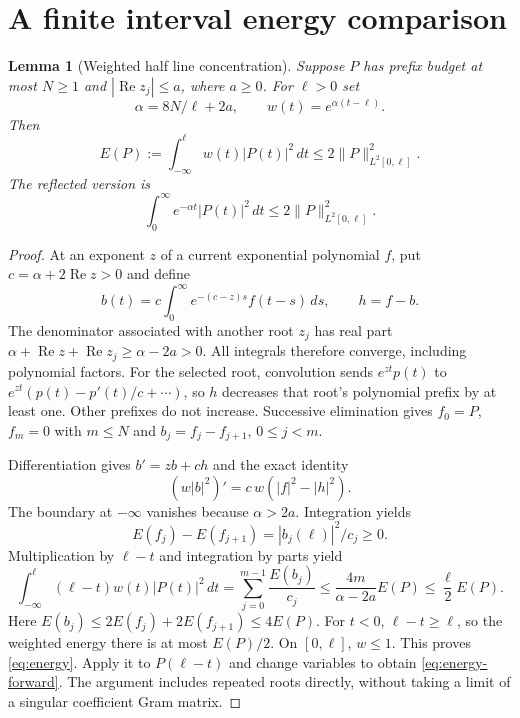 \documentclass[11pt]{article}
\newtheorem{lemma}[theorem]{Lemma}
\theoremstyle{remark}
\newcommand{\norm}[1]{\lVert #1\rVert}
\newcommand{\Rea}{\operatorname{Re}}
\begin{document}
\section{A finite interval energy comparison}
\begin{lemma}[Weighted half line concentration]\label{lem:energy}
Suppose $P$ has prefix budget at most $N\ge1$ and $|\Rea z_j|\le a$,
where $a\ge0$. For $\ell>0$ set
\[
 \alpha=8N/\ell+2a,\qquad w(t)=e^{\alpha(t-\ell)}.
\]
Then
\begin{equation}\label{eq:energy}
 E(P):=\int_{-\infty}^{\ell}w(t)|P(t)|^2\,dt
       \le2\norm P_{L^2[0,\ell]}^2.
\end{equation}
The reflected version is
\begin{equation}\label{eq:energy-forward}
 \int_0^\infty e^{-\alpha t}|P(t)|^2\,dt
       \le2\norm P_{L^2[0,\ell]}^2.
\end{equation}
\end{lemma}
\begin{proof}
At an exponent $z$ of a current exponential polynomial $f$, put
$c=\alpha+2\Rea z>0$ and define
\[
 b(t)=c\int_0^\infty e^{-(c-z)s}f(t-s)\,ds,\qquad h=f-b.
\]
The denominator associated with another root $z_j$ has real part
$\alpha+\Rea z+\Rea z_j\ge\alpha-2a>0$.
All integrals therefore converge, including polynomial factors.
For the selected root, convolution sends $e^{zt}p(t)$ to
$e^{zt}(p(t)-p'(t)/c+\cdots)$, so $h$ decreases that root's polynomial
prefix by at least one. Other prefixes do not increase.
Successive elimination gives $f_0=P$, $f_m=0$ with $m\le N$ and
$b_j=f_j-f_{j+1}$, $0\le j<m$.

Differentiation gives $b'=zb+ch$ and the exact identity
\begin{equation}\label{eq:energy-identity}
 (w|b|^2)'=c\,w(|f|^2-|h|^2).
\end{equation}
The boundary at $-\infty$ vanishes because $\alpha>2a$.
Integration yields
\[
 E(f_j)-E(f_{j+1})=|b_j(\ell)|^2/c_j\ge0.
\]
Multiplication by $\ell-t$ and integration by parts yield
\[
 \int_{-\infty}^{\ell}(\ell-t)w(t)|P(t)|^2\,dt
   =\sum_{j=0}^{m-1}\frac{E(b_j)}{c_j}
   \le\frac{4m}{\alpha-2a}E(P)\le\frac\ell2E(P).
\]
Here $E(b_j)\le2E(f_j)+2E(f_{j+1})\le4E(P)$.
For $t<0$, $\ell-t\ge\ell$, so the weighted energy there is at most
$E(P)/2$. On $[0,\ell]$, $w\le1$. This proves \eqref{eq:energy}.
Apply it to $P(\ell-t)$ and change variables to obtain
\eqref{eq:energy-forward}.
The argument includes repeated roots directly, without taking a limit
of a singular coefficient Gram matrix.
\end{proof}
\end{document}
